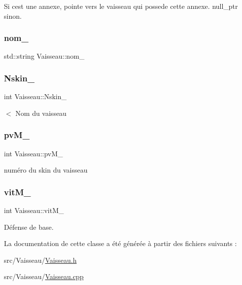 Si c\textquotesingle{}est une annexe, pointe vers le vaisseau qui possede cette annexe. null\+\_\+ptr sinon. 

\mbox{\label{class_vaisseau_a2abb8ab70479bc486d19b563dddbe825}} 
\subsubsection{\texorpdfstring{nom\+\_\+}{nom\_}}
{\footnotesize\ttfamily std\+::string Vaisseau\+::nom\+\_\+\hspace{0.3cm}{\ttfamily [protected]}}

\mbox{\label{class_vaisseau_af6b149a2f49de284503d5e3f80e2735a}} 
\subsubsection{\texorpdfstring{Nskin\+\_\+}{Nskin\_}}
{\footnotesize\ttfamily int Vaisseau\+::\+Nskin\+\_\+\hspace{0.3cm}{\ttfamily [protected]}}



$<$ Nom du vaisseau 

\mbox{\label{class_vaisseau_ac8b21f62b8c41f90864b1bca81d685de}} 
\subsubsection{\texorpdfstring{pv\+M\+\_\+}{pvM\_}}
{\footnotesize\ttfamily int Vaisseau\+::pv\+M\+\_\+\hspace{0.3cm}{\ttfamily [protected]}}



numéro du skin du vaisseau 

\mbox{\label{class_vaisseau_a7cf3915f4d4044ee28fd5e5633fce11c}} 
\subsubsection{\texorpdfstring{vit\+M\+\_\+}{vitM\_}}
{\footnotesize\ttfamily int Vaisseau\+::vit\+M\+\_\+\hspace{0.3cm}{\ttfamily [protected]}}



Défense de base. 



La documentation de cette classe a été générée à partir des fichiers suivants \+:\begin{DoxyCompactItemize}
\item 
src/\+Vaisseau/\hyperlink{_vaisseau_8h}{Vaisseau.\+h}\item 
src/\+Vaisseau/\hyperlink{_vaisseau_8cpp}{Vaisseau.\+cpp}\end{DoxyCompactItemize}
